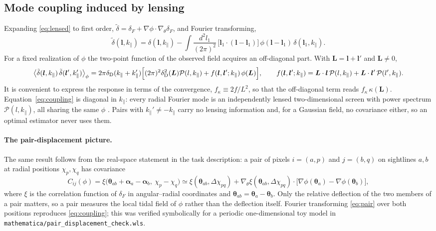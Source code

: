 \documentclass[11pt,a4paper]{article}
\newcommand{\dF}{\delta_F}
\newcommand{\dt}{\tilde\delta}
\newcommand{\vl}{\bm{l}}
\newcommand{\vL}{\bm{L}}
\newcommand{\vth}{\bm{\theta}}
\newcommand{\kpar}{k_\parallel}
\newcommand{\PP}{\mathcal{P}}
\newcommand{\dD}{\delta_{\rm D}}
\begin{document}
\subsection{Mode coupling induced by lensing}
\label{sec:coupling}

Expanding \eqref{eq:lensed} to first order, $\dt=\dF+\nabla\phi\cdot\nabla_\theta\dF$, and Fourier transforming,
\begin{equation}
\dt(\vl,\kpar)=\delta(\vl,\kpar)-\int\frac{d^2l_1}{(2\pi)^2}\,\big[\vl_1\cdot(\vl-\vl_1)\big]\,\phi(\vl-\vl_1)\,\delta(\vl_1,\kpar).
\label{eq:dt}
\end{equation}
For a fixed realization of $\phi$ the two-point function of the observed field acquires an off-diagonal part. With $\vL=\vl+\vl'$ and $\vL\neq0$,
\begin{equation}
\big\langle\dt(\vl,\kpar)\,\dt(\vl',\kpar')\big\rangle_\phi
=2\pi\dD(\kpar+\kpar')\Big[(2\pi)^2\dD^2(\vL)\PP(l,\kpar)+f(\vl,\vl';\kpar)\,\phi(\vL)\Big],
\qquad
f(\vl,\vl';\kpar)=\vL\cdot\vl\,\PP(l,\kpar)+\vL\cdot\vl'\,\PP(l',\kpar).
\label{eq:coupling}
\end{equation}
It is convenient to express the response in terms of the convergence, $f_\kappa\equiv 2f/L^2$, so that the off-diagonal term reads $f_\kappa\,\kappa(\vL)$. Equation~\eqref{eq:coupling} is diagonal in $\kpar$: every radial Fourier mode is an independently lensed two-dimensional screen with power spectrum $\PP(l,\kpar)$, all sharing the same $\phi$ \citep{astro-ph/0511547}. Pairs with $\kpar'\neq-\kpar$ carry no lensing information and, for a Gaussian field, no covariance either, so an optimal estimator never uses them.

\paragraph{The pair-displacement picture.}
The same result follows from the real-space statement in the task description: a pair of pixels $i=(a,p)$ and $j=(b,q)$ on sightlines $a,b$ at radial positions $\chi_p,\chi_q$ has covariance
\begin{equation}
C_{ij}(\phi)=\xi\big(\vth_{ab}+\bm\alpha_a-\bm\alpha_b,\ \chi_p-\chi_q\big)
\simeq \xi(\vth_{ab},\Delta\chi_{pq})+\nabla_\theta\xi(\vth_{ab},\Delta\chi_{pq})\cdot\big[\nabla\phi(\vth_a)-\nabla\phi(\vth_b)\big],
\label{eq:pair}
\end{equation}
where $\xi$ is the correlation function of $\dF$ in angular--radial coordinates and $\vth_{ab}=\vth_a-\vth_b$. Only the relative deflection of the two members of a pair matters, so a pair measures the local tidal field of $\phi$ rather than the deflection itself. Fourier transforming \eqref{eq:pair} over both positions reproduces \eqref{eq:coupling}; this was verified symbolically for a periodic one-dimensional toy model in \texttt{mathematica/pair\_displacement\_check.wls}.
\end{document}
